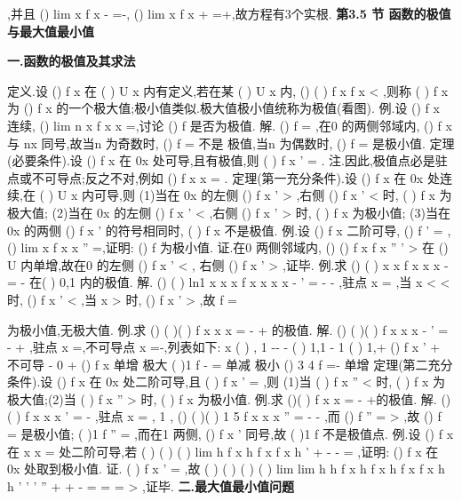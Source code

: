 ,并且 
()
lim
x
f x
\to -\infty 
=-\infty ,
()
lim
x
f x
\to +\infty 
=+\infty ,故方程有3个实根. 
\vspace{6pt}
{\large \bfseries \textcolor{lyred}{第3.5 节 函数的极值与最大值最小值}}

\vspace{4pt}
{\bfseries \textcolor{lyred}{一.函数的极值及其求法}}

\textcolor{lyred}{定义}.设
()
f x 在
(
)
U x
内有定义,若在某
(
)
U x
\circ 
内,
()
(
)
f x
f x
<
,则称
(
)
f x
为 
()
f x 的一个\textcolor{lyred}{极大值};\textcolor{lyred}{极小值}类似.极大值极小值统称为\textcolor{lyred}{极值}(看图). 
\textcolor{lyred}{例}.设
()
f x 连续,
()
lim
n
x
f x
x
\to 
=,讨论
()
f
是否为极值. 
解.
()
f
=
,在0 的两侧邻域内,
()
f x 与
nx 同号,故当n 为奇数时,
()
f
=
不是 
极值,当n 为偶数时,
()
f
=
是极小值. 
\textcolor{lyred}{定理(必要条件)}.设
()
f x 在
0x 处可导,且有极值,则
(
)
f
x
'
=
. 
\textcolor{lyred}{注}.因此,极值点必是驻点或不可导点;反之不对,例如
()
f x
x
=
. 
\textcolor{lyred}{定理(第一充分条件)}.设
()
f x 在
0x 处连续,在
(
)
U x
\circ 
内可导,则 
(1)当在
0x 的左侧
()
f
x
'
>
,右侧
()
f
x
'
<
时,
(
)
f x
为极大值; 
(2)当在
0x 的左侧
()
f
x
'
<
,右侧
()
f
x
'
>
时,
(
)
f x
为极小值; 
(3)当在
0x 的两侧
()
f
x
'
的符号相同时,
(
)
f x
不是极值. 
\textcolor{lyred}{例}.设
()
f x 二阶可导,
()
f '
=
,
()
lim
x
f
x
x
\to 
''
=,证明:
()
f
为极小值. 
证.在0 两侧邻域内,
()
()
f
x
f
x
''
'
>
\Rightarrow 
在
()
U
内单增,故在0 的左侧
()
f
x
'
<
, 
右侧
()
f
x
'
>
,证毕. 
\textcolor{lyred}{例}.求
()
(
)
x
x
f x
x
x
-
=
-
在(
)
0,1 内的极值. 
解.
()
(
)
ln1
x
x
x
f
x
x
x
x
-
'
=
-
-
,驻点
x =
,当
x
<
<
时,
()
f
x
'
<
,当
x >
时, 
()
f
x
'
>
,故
f 
=




为极小值,无极大值. 
\textcolor{lyred}{例}.求
()
(
)(
)
f x
x
x
=
-
+
的极值. 
解.
()
(
)(
)
f
x
x
x
-
'
=
-
+
,驻点
x =,不可导点
x =-,列表如下: 
x        (
)
, 1
-\infty -
-        (
)
1,1
-
        1          (
)
1,+\infty  
()
f
x
'
       +         不可导       -          0            + 
()
f x      单增    极大
(
)1
f -
=
    单减   极小
()
3 4
f
=-
   单增 
\textcolor{lyred}{定理(第二充分条件)}.设
()
f x 在
0x 处二阶可导,且
(
)
f
x
'
=
,则 
(1)当
(
)
f
x
''
<
时,
(
)
f x
为极大值;(2)当
(
)
f
x
''
>
时,
(
)
f x
为极小值. 
\textcolor{lyred}{例}.求
()(
)
f x
x
=
-
+的极值. 
解.
()
(
)
f
x
x x
'
=
-
,驻点
x =
, 1
\pm ,
()
(
)(
)
1 5
f
x
x
x
''
=
-
-
,而 
()
f ''
=
>
,故
()
f
=
是极小值; 
(
)1
f ''\pm 
=
,而在1
\pm 两侧,
()
f
x
'
同号,故
(
)1
f \pm 
不是极值点. 
\textcolor{lyred}{例}.设
()
f
x 在
x
x
=
处二阶可导,若
(
)
(
)
(
)
lim
h
f x
h
f x
f
x
h
\to 
'
+
-
-
=
,证明: 
()
f
x 在
0x 处取到极小值. 
证.
(
)
f
x
'
=
,故
(
)
(
)
(
)
(
)
lim
lim
h
h
f
x
h
f
x
h
f
x
f
x
h
h
\to 
\to 
'
'
'
''
+
+
-
=
=
=
>
,证毕. 
\vspace{4pt}
{\bfseries \textcolor{lyred}{二.最大值最小值问题}}

